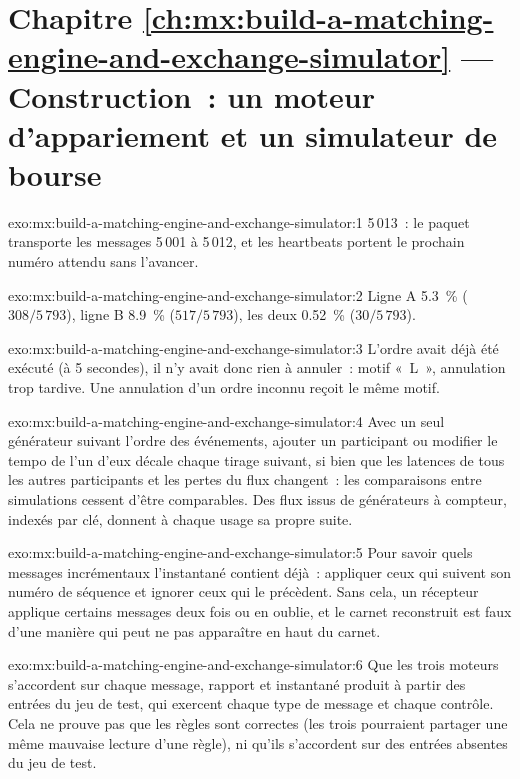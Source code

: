 \section*{Chapitre \ref{ch:mx:build-a-matching-engine-and-exchange-simulator} --- Construction~: un moteur d'appariement et un simulateur de bourse}

\begin{solution}{exo:mx:build-a-matching-engine-and-exchange-simulator:1}
5\,013~: le paquet transporte les messages 5\,001 à 5\,012, et les heartbeats portent le prochain numéro attendu sans l'avancer.
\end{solution}

\begin{solution}{exo:mx:build-a-matching-engine-and-exchange-simulator:2}
Ligne A 5.3~\% ($308/5\,793$), ligne B 8.9~\% ($517/5\,793$), les deux 0.52~\% ($30/5\,793$).
\end{solution}

\begin{solution}{exo:mx:build-a-matching-engine-and-exchange-simulator:3}
L'ordre avait déjà été exécuté (à 5 secondes), il n'y avait donc rien à annuler~: motif «~L~», annulation trop tardive. Une annulation d'un ordre inconnu reçoit le
même motif.
\end{solution}

\begin{solution}{exo:mx:build-a-matching-engine-and-exchange-simulator:4}
Avec un seul générateur suivant l'ordre des événements, ajouter un participant ou modifier le tempo de l'un d'eux décale chaque tirage suivant, si bien que les latences de tous les autres participants et les
pertes du flux changent~: les comparaisons entre simulations cessent d'être comparables. Des flux issus de générateurs à compteur, indexés par clé, donnent à chaque usage sa propre suite.
\end{solution}

\begin{solution}{exo:mx:build-a-matching-engine-and-exchange-simulator:5}
Pour savoir quels messages incrémentaux l'instantané contient déjà~: appliquer ceux qui suivent son numéro de séquence et ignorer ceux qui le précèdent. Sans cela, un récepteur
applique certains messages deux fois ou en oublie, et le carnet reconstruit est faux d'une manière qui peut ne pas apparaître en haut du carnet.
\end{solution}

\begin{solution}{exo:mx:build-a-matching-engine-and-exchange-simulator:6}
Que les trois moteurs s'accordent sur chaque message, rapport et instantané produit à partir des entrées du jeu de test, qui exercent chaque type de message et chaque contrôle. Cela ne
prouve pas que les règles sont correctes (les trois pourraient partager une même mauvaise lecture d'une règle), ni qu'ils s'accordent sur des entrées absentes du jeu de test.
\end{solution}

